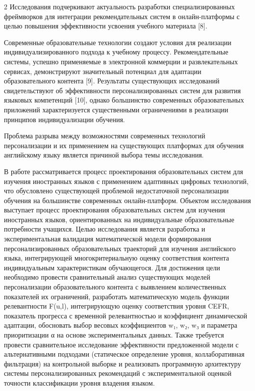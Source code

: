 \begin{multicols}{2}
Исследования подчеркивают актуальность разработки специализированных
фреймворков для интеграции рекомендательных систем в онлайн-платформы с
целью повышения эффективности усвоения учебного материала {[}8{]}.

Современные образовательные технологии создают условия для реализации
индивидуализированного подхода к учебному процессу. Рекомендательные
системы, успешно применяемые в электронной коммерции и развлекательных
сервисах, демонстрируют значительный потенциал для адаптации
образовательного контента {[}9{]}. Результаты существующих исследований
свидетельствуют об эффективности персонализированных систем для развития
языковых компетенций {[}10{]}, однако большинство современных
образовательных приложений характеризуется существенными ограничениями в
реализации принципов индивидуализации обучения.

Проблема разрыва между возможностями современных технологий
персонализации и их применением на существующих платформах для обучения
английскому языку является причиной выбора темы исследования.

В работе рассматривается процесс проектирования образовательных систем
для изучения иностранных языков с применением адаптивных цифровых
технологий, что обусловлено существующей проблемой недостаточной
персонализации обучения на большинстве современных онлайн-платформ.
Объектом исследования выступает процесс проектирования образовательных
систем для изучения иностранных языков, ориентированных на
индивидуальные образовательные потребности учащихся. Целью исследования
является разработка и экспериментальная валидация математической модели
формирования персонализированных образовательных траекторий для изучения
английского языка, интегрирующей многокритериальную оценку соответствия
контента индивидуальным характеристикам обучающегося. Для достижения
цели необходимо провести сравнительный анализ существующих моделей
персонализации образовательного контента с выявлением количественных
показателей их ограничений, разработать математическую модель функции
релевантности F(u,l), интегрирующую оценку соответствия уровня CEFR,
показатель прогресса с временной релевантностью и коэффициент
динамической адаптации, обосновать выбор весовых коэффициентов w₁, w₂,
w₃ и параметра приоритизации α на основе экспериментальных данных. Также
требуется провести сравнительное исследование эффективности предложенной
модели с альтернативными подходами (статическое определение уровня,
коллаборативная фильтрация) на контрольной выборке и реализовать
программную архитектуру системы персонализированных рекомендаций с
экспериментальной оценкой точности классификации уровня владения языком.


\end{multicols}
